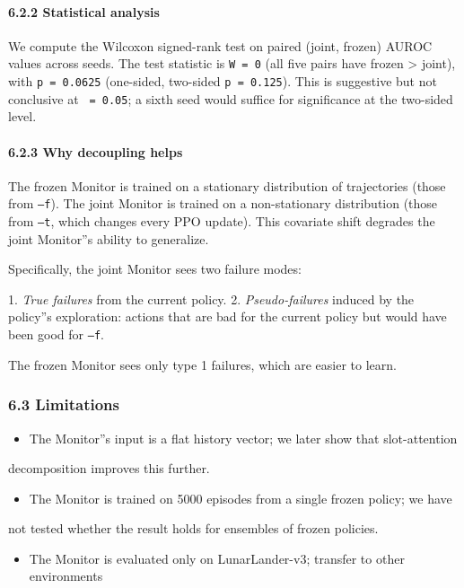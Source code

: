 \documentclass[11pt]{article}
\begin{document}
\paragraph{6.2.2 Statistical analysis}

We compute the Wilcoxon signed-rank test on paired (joint, frozen) AUROC values
across seeds. The test statistic is \texttt{W = 0} (all five pairs have frozen > joint),
with \texttt{p = 0.0625} (one-sided, two-sided \texttt{p = 0.125}). This is suggestive but not
conclusive at \texttt{ = 0.05}; a sixth seed would suffice for significance at the
two-sided level.

\paragraph{6.2.3 Why decoupling helps}

The frozen Monitor is trained on a stationary distribution of trajectories
(those from \texttt{---f}). The joint Monitor is trained on a non-stationary
distribution (those from \texttt{---t}, which changes every PPO update). This covariate
shift degrades the joint Monitor''s ability to generalize.

Specifically, the joint Monitor sees two failure modes:

1. \textit{True failures} from the current policy.
2. \textit{Pseudo-failures} induced by the policy''s exploration: actions that are bad for
   the current policy but would have been good for \texttt{---f}.

The frozen Monitor sees only type 1 failures, which are easier to learn.

\subsubsection{6.3 Limitations}

\begin{itemize}
  \item The Monitor''s input is a flat history vector; we later show that slot-attention
\end{itemize}

  decomposition improves this further.
\begin{itemize}
  \item The Monitor is trained on 5000 episodes from a single frozen policy; we have
\end{itemize}

  not tested whether the result holds for ensembles of frozen policies.
\begin{itemize}
  \item The Monitor is evaluated only on LunarLander-v3; transfer to other environments
\end{itemize}
\end{document}
